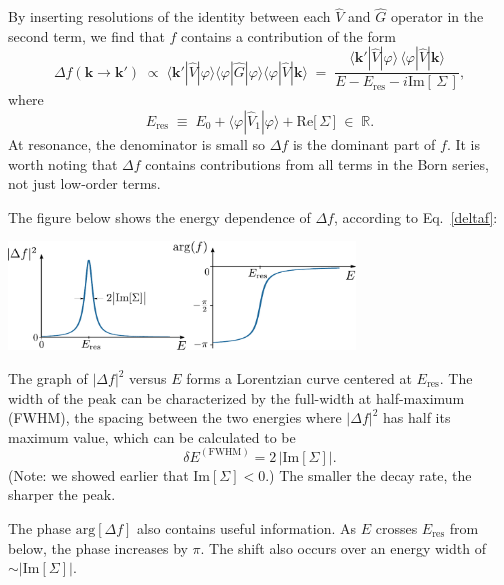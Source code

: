 \documentclass[prx,12pt]{revtex4-2}
\begin{document}
By inserting resolutions of the identity between each $\hat{V}$ and
$\hat{G}$ operator in the second term, we find that $f$ contains a
contribution of the form
\begin{equation}
  \Delta f(\mathbf{k}\rightarrow\mathbf{k}') \;\propto\; \langle \mathbf{k}'|\hat{V}|\varphi\rangle\langle\varphi|\hat{G}|\varphi\rangle\langle\varphi|\hat{V}|\mathbf{k}\rangle \;=\; \frac{\langle \mathbf{k}'|\hat{V}|\varphi\rangle \, \langle\varphi|\hat{V}|\mathbf{k}\rangle}{\displaystyle E - E_{\mathrm{res}} - i \mathrm{Im}[\,\Sigma\,]},
  \label{deltaf}
\end{equation}
where
\begin{equation}
  E_{\mathrm{res}} \;\equiv\; E_0 + \langle\varphi|\hat{V}_1|\varphi\rangle + \mathrm{Re}\big[\,\Sigma\,\big] \;\in\; \mathbb{R}.
  \label{Eres}
\end{equation}
At resonance, the denominator is small so $\Delta f$ is the dominant
part of $f$.  It is worth noting that $\Delta f$ contains
contributions from all terms in the Born series, not just low-order
terms.

The figure below shows the energy dependence of $\Delta f$, according
to Eq.~\eqref{deltaf}:

\begin{center}
  \includegraphics[width=0.69\textwidth]{resonance}  
\end{center}

\noindent
The graph of $|\Delta f|^2$ versus $E$ forms a Lorentzian curve
centered at $E_{\mathrm{res}}$.  The width of the peak can be
characterized by the full-width at half-maximum (FWHM), the spacing
between the two energies where $|\Delta f|^2$ has half its maximum
value, which can be calculated to be
\begin{equation}
  \delta E^{(\mathrm{FWHM})} = 2\, \big|\mathrm{Im}[\Sigma]\big|.
\end{equation}
(Note: we showed earlier that $\mathrm{Im}[\Sigma] < 0$.)  The smaller
the decay rate, the sharper the peak.

The phase $\mathrm{arg}[\Delta f]$ also contains useful information.
As $E$ crosses $E_{\mathrm{res}}$ from below, the phase increases by
$\pi$.  The shift also occurs over an energy width of $\sim
|\mathrm{Im}[\Sigma]|$.
\end{document}
